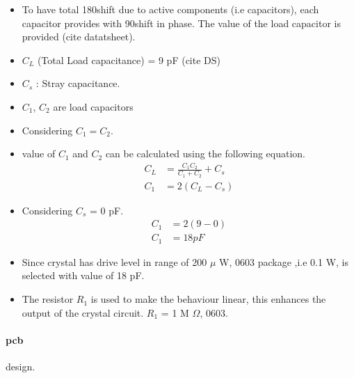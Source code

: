 \begin{enumerate}
\begin{itemize}
	\item To have total 180\textdegree 	 shift due to active components (i.e capacitors), each capacitor provides with 90\textdegree  shift in phase. The value of the load capacitor is provided (cite datatsheet). 
	\item $C_{L}$ (Total Load capacitance) = 9 pF (cite DS)
	\item $C_{s}$ : Stray capacitance.
	\item $C_{1}$, $C_{2}$ are load capacitors
	\item Considering $C_{1} = C_{2}$. 
	\item value of $C_{1}$ and $C_{2}$ can be calculated using the following equation.
					\begin{align}				
						C_{L} &= {\frac{C_{1}C_{2} }{C_{1} + C_{2}}} + C_{s}\\
						C_{1} &= 2(C_{L} - C_{s})			
					\end{align}
	\item Considering $C_{s}$ = 0 pF.
					\begin{align}
						C_{1} &= 2(9 - 0)\\
						C_{1} &= 18 pF
					\end{align}
	\item Since crystal has drive level in range of 200 $\mu$ W, 0603 package ,i.e 0.1 W, is selected with value of 18 pF.
	\item The resistor $R_{1}$ is used to make the behaviour linear, this enhances the output of the crystal circuit. $R_{1}$ = 1 M $\Omega$, 0603.
				\end{itemize}
		
		\end{enumerate}		
	\paragraph{\gls{pcb} } design.
	

\cite{AVR042}

